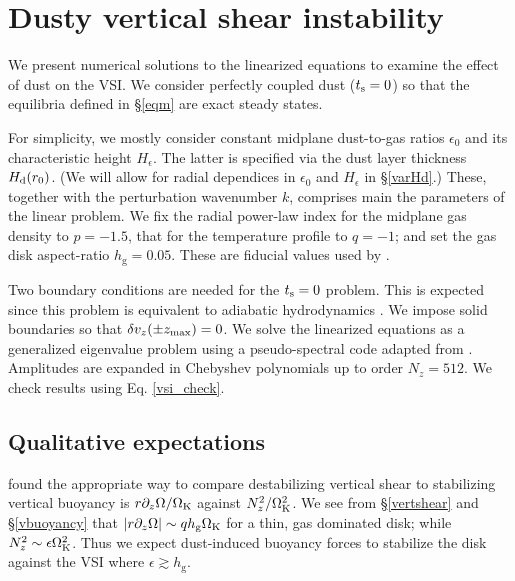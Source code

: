 \section{
  Dusty vertical shear instability}\label{results} 



We present numerical solutions to the linearized
equations to examine the effect of dust on the VSI. 
We consider perfectly coupled dust ($t_\mathrm{s}=0$) so that the 
equilibria defined in \S\ref{eqm} are exact steady states. 

For simplicity, we mostly consider constant midplane
dust-to-gas ratios $\epsilon_0$ and its characteristic height
$H_\epsilon$. The latter is specified via the dust layer thickness
$H_\mathrm{d}(r_0)$. (We will allow for radial dependices in $\epsilon_0$ and
$H_\epsilon$ in \S\ref{varHd}.)   
These, together with the perturbation wavenumber $k$, comprises main the
parameters of the linear problem. We fix the radial power-law index
for the midplane gas density to $p = -1.5$, that for the
temperature profile to $q=-1$; and set the gas disk aspect-ratio
$h_\mathrm{g}=0.05$. These are fiducial values used by 
\citet[][ in this section]{lin15}. 

Two boundary conditions are needed for the $t_\mathrm{s}=0$
problem. This is expected since this problem is equivalent to
adiabatic hydrodynamics \citep[e.g.][]{lubow93}. We 
impose solid boundaries so that $\delta v_z(\pm z_\mathrm{max})=0$.  
We solve the linearized equations as a generalized eigenvalue problem 
using a pseudo-spectral code adapted from \cite{lin15}. Amplitudes 
are expanded in Chebyshev polynomials up to order $N_z=512$. We check
results using Eq. \ref{vsi_check}.    

\subsection{Qualitative expectations}\label{vsi_est}
\cite{lin15} found the appropriate way to compare 
destabilizing vertical shear to stabilizing vertical buoyancy is
$r\partial_z\Omega/\Omega_{\rm K}$ against $N_z^2/\Omega_{\rm K}^2$. We see from \S\ref{vertshear}
and \S\ref{vbuoyancy} that $|r\partial_z\Omega|\sim q h_\mathrm{g}\Omega_{\rm K}$ for a
thin, gas dominated disk; while $N_z^2\sim \epsilon\Omega_{\rm K}^2$. Thus we
expect dust-induced buoyancy forces to stabilize the disk against the
VSI where $\epsilon \gtrsim h_\mathrm{g}$. 

